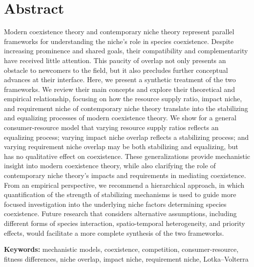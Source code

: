 \section{Abstract}
Modern coexistence theory and contemporary niche theory represent parallel frameworks for understanding the niche's role in species coexistence. Despite increasing prominence and shared goals, their compatibility and complementarity have received little attention. This paucity of overlap not only presents an obstacle to newcomers to the field, but it also precludes further conceptual advances at their interface. Here, we present a synthetic treatment of the two frameworks. We review their main concepts and explore their theoretical and empirical relationship, focusing on how the resource supply ratio, impact niche, and requirement niche of contemporary niche theory translate into the stabilizing and equalizing processes of modern coexistence theory. We show for a general consumer-resource model that varying resource supply ratios reflects an equalizing process; varying impact niche overlap reflects a stabilizing process; and varying requirement niche overlap may be both stabilizing and equalizing, but has no qualitative effect on coexistence. These generalizations provide mechanistic insight into modern coexistence theory, while also clarifying the role of contemporary niche theory's impacts and requirements in mediating coexistence. From an empirical perspective, we recommend a hierarchical approach, in which quantification of the strength of stabilizing mechanisms is used to guide more focused investigation into the underlying niche factors determining species coexistence. Future research that considers alternative assumptions, including different forms of species interaction, spatio-temporal heterogeneity, and priority effects, would facilitate a more complete synthesis of the two frameworks.
\medskip


\noindent \textbf{Keywords:} mechanistic models, coexistence, competition, consumer-resource, fitness differences, niche overlap, impact niche, requirement niche, Lotka--Volterra



